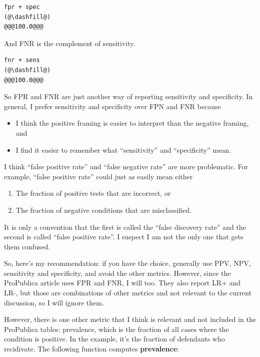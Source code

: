 \begin{lstlisting}[]
fpr + spec
(@\dashfill@)
@@@100.0@@@
\end{lstlisting}

And FNR is the complement of sensitivity.

\begin{lstlisting}[]
fnr + sens
(@\dashfill@)
@@@100.0@@@
\end{lstlisting}

So FPR and FNR are just another way of reporting sensitivity and
specificity. In general, I prefer sensitivity and specificity over FPN
and FNR because

\begin{itemize}
\item
  I think the positive framing is easier to interpret than the negative
  framing, and
\item
  I find it easier to remember what ``sensitivity'' and ``specificity''
  mean.
\end{itemize}

I think ``false positive rate'' and ``false negative rate'' are more
problematic. For example, ``false positive rate'' could just as easily
mean either

\begin{enumerate}
\def\labelenumi{\arabic{enumi}.}
\item
  The fraction of positive tests that are incorrect, or
\item
  The fraction of negative conditions that are misclassified.
\end{enumerate}

It is only a convention that the first is called the ``false discovery
rate'' and the second is called ``false positive rate''. I suspect I am
not the only one that gets them confused.

So, here's my recommendation: if you have the choice, generally use PPV,
NPV, sensitivity and specificity, and avoid the other metrics. However,
since the ProPublica article uses FPR and FNR, I will too. They also
report LR+ and LR-, but those are combinations of other metrics and not
relevant to the current discussion, so I will ignore them.

However, there is one other metric that I think is relevant and not
included in the ProPublica tables: prevalence, which is the fraction of
all cases where the condition is positive. In the example, it's the
fraction of defendants who recidivate. The following function computes
\textbf{prevalence}:

